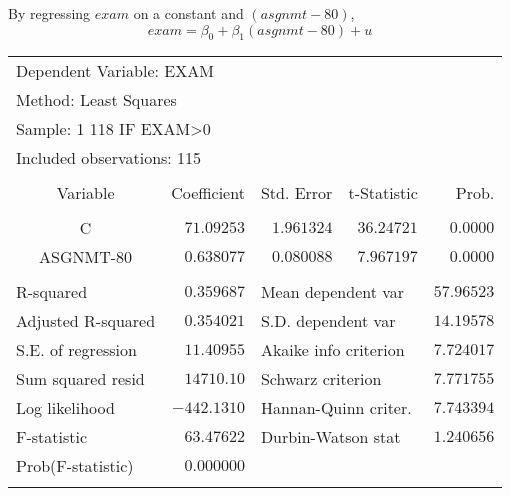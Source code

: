 \documentclass[12pt]{report}
\begin{document}
\noindent By regressing $exam$ on a constant and $(asgnmt-80)$,
$$exam = \beta_0 + \beta_1(asgnmt-80) + u$$
\begin{figure}[H]
	\centering
\end{figure}
\vspace{-\baselineskip}
\begin{table}[H]
	\centering
	\begin{tabular}{lrrrr}
		\multicolumn{3}{l}{Dependent Variable: EXAM}&\multicolumn{1}{c}{}&\multicolumn{1}{c}{}\\
		\multicolumn{3}{l}{Method: Least Squares}&\multicolumn{1}{c}{}&\multicolumn{1}{c}{}\\
		\multicolumn{3}{l}{Sample: 1 118 IF EXAM\textgreater 0}&\multicolumn{1}{c}{}&\multicolumn{1}{c}{}\\
		\multicolumn{3}{l}{Included observations: 115}&\multicolumn{1}{c}{}&\multicolumn{1}{c}{}\\
		[4.5pt] \hline \\ [-4.5pt]
		\multicolumn{1}{c}{Variable}&\multicolumn{1}{r}{Coefficient}&\multicolumn{1}{r}{Std. Error}&\multicolumn{1}{r}{t-Statistic}&\multicolumn{1}{r}{Prob.}\\
		[4.5pt] \hline \\ [-4.5pt]
		\multicolumn{1}{c}{C}&\multicolumn{1}{r}{$71.09253$}&\multicolumn{1}{r}{$1.961324$}&\multicolumn{1}{r}{$36.24721$}&\multicolumn{1}{r}{$0.0000$}\\
		\multicolumn{1}{c}{ASGNMT-80}&\multicolumn{1}{r}{$0.638077$}&\multicolumn{1}{r}{$0.080088$}&\multicolumn{1}{r}{$7.967197$}&\multicolumn{1}{r}{$0.0000$}\\
		[4.5pt] \hline \\ [-4.5pt]
		\multicolumn{1}{l}{R-squared}&\multicolumn{1}{r}{$0.359687$}&\multicolumn{2}{l}{Mean dependent var}&\multicolumn{1}{r}{$57.96523$}\\
		\multicolumn{1}{l}{Adjusted R-squared}&\multicolumn{1}{r}{$0.354021$}&\multicolumn{2}{l}{S.D. dependent var}&\multicolumn{1}{r}{$14.19578$}\\
		\multicolumn{1}{l}{S.E. of regression}&\multicolumn{1}{r}{$11.40955$}&\multicolumn{2}{l}{Akaike info criterion}&\multicolumn{1}{r}{$7.724017$}\\
		\multicolumn{1}{l}{Sum squared resid}&\multicolumn{1}{r}{$14710.10$}&\multicolumn{2}{l}{Schwarz criterion}&\multicolumn{1}{r}{$7.771755$}\\
		\multicolumn{1}{l}{Log likelihood}&\multicolumn{1}{r}{$-442.1310$}&\multicolumn{2}{l}{Hannan-Quinn criter.}&\multicolumn{1}{r}{$7.743394$}\\
		\multicolumn{1}{l}{F-statistic}&\multicolumn{1}{r}{$63.47622$}&\multicolumn{2}{l}{Durbin-Watson stat}&\multicolumn{1}{r}{$1.240656$}\\
		\multicolumn{1}{l}{Prob(F-statistic)}&\multicolumn{1}{r}{$0.000000$}&\multicolumn{1}{c}{}&\multicolumn{1}{c}{}&\multicolumn{1}{c}{}\\
		[4.5pt] \hline \\ [-4.5pt]
	\end{tabular}
\end{table}
\end{document}
